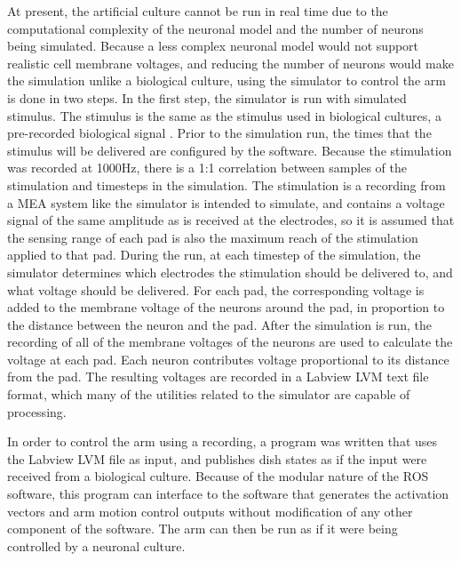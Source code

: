 \documentclass[letterpaper]{article}
\begin{document}
At present, the artificial culture cannot be run in real time due to the computational complexity of the neuronal model and the number of neurons being simulated. 
Because a less complex neuronal model would not support realistic cell membrane voltages, and reducing the number of neurons would make the simulation unlike a biological culture, using the simulator to control the arm is done in two steps. 
In the first step, the simulator is run with simulated stimulus. 
The stimulus is the same as the stimulus used in biological cultures, a pre-recorded biological signal \cite{zemianek2012stimulation}. 
Prior to the simulation run, the times that the stimulus will be delivered are configured by the software. 
Because the stimulation was recorded at 1000Hz, there is a 1:1 correlation between samples of the stimulation and timesteps in the simulation. 
The stimulation is a recording from a MEA system like the simulator is intended to simulate, and contains a voltage signal of the same amplitude as is received at the electrodes, so it is assumed that the sensing range of each pad is also the maximum reach of the stimulation applied to that pad. 
During the run, at each timestep of the simulation, the simulator determines which electrodes the stimulation should be delivered to, and what voltage should be delivered.
For each pad, the corresponding voltage is added to the membrane voltage of the neurons around the pad, in proportion to the distance between the neuron and the pad. 
After the simulation is run, the recording of all of the membrane voltages of the neurons are used to calculate the voltage at each pad. 
Each neuron contributes voltage proportional to its distance from the pad. 
The resulting voltages are recorded in a Labview LVM text file format, which many of the utilities related to the simulator are capable of processing. 

In order to control the arm using a recording, a program was written that uses the Labview LVM file as input, and publishes dish states as if the input were received from a biological culture.
Because of the modular nature of the ROS software, this program can interface to the software that generates the activation vectors and arm motion control outputs without modification of any other component of the software. 
The arm can then be run as if it were being controlled by a neuronal culture. 
\end{document}
